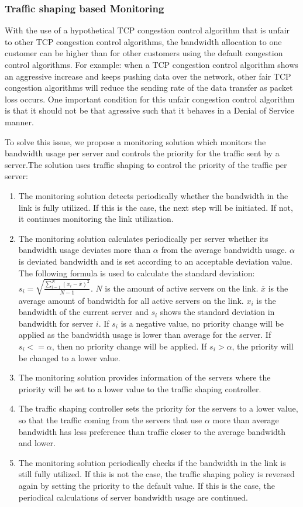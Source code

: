 \documentclass{article}
\begin{document}
\subsubsection{Traffic shaping based Monitoring}
With the use of a hypothetical TCP congestion control algorithm that is unfair to other TCP congestion control algorithms, the bandwidth allocation to one customer can be higher than for other customers using the default congestion control algorithms. For example: when a TCP congestion control algorithm shows an aggressive increase and keeps pushing data over the network, other fair TCP congestion algorithms will reduce the sending rate of the data transfer as packet loss occurs. One important condition for this unfair congestion control algorithm is that it should not be that agressive such that it behaves in a Denial of Service manner.

To solve this issue, we propose a monitoring solution which monitors the bandwidth usage per server and controls the priority for the traffic sent by a server.The solution uses traffic shaping to control the priority of the traffic per server:
\begin{enumerate}
	\item The monitoring solution detects periodically whether the bandwidth in the link is fully utilized. If this is the case, the next step will be initiated. If not, it continues monitoring the link utilization.
	\item The monitoring solution calculates periodically per server whether its bandwidth usage deviates more than $\alpha$ from the average bandwidth usage. $\alpha$ is deviated bandwidth and is set according to an acceptable deviation value. The following formula is used to calculate the standard deviation: $s_{i} = \sqrt{\frac{\sum_{i=1}^N (x_i - \overline{x})^2}{N-1} }$. $N$ is the amount of active servers on the link. $\overline{x}$ is the average amount of bandwidth for all active servers on the link. $x_i$ is the bandwidth of the current server and $s_{i}$ shows the standard deviation in bandwidth for server $i$. If $s_{i}$ is a negative value, no priority change will be applied as the bandwidth usage is lower than average for the server. If $s_{i} <= \alpha$, then no priority change will be applied. If $s_{i} > \alpha$, the priority will be changed to a lower value.
	\item The monitoring solution provides information of the servers where the priority will be set to a lower value to the traffic shaping controller.
	\item The traffic shaping controller sets the priority for the servers to a lower value, so that the traffic coming from the servers that use $\alpha$ more than average bandwidth has less preference than traffic closer to the average bandwidth and lower.
	\item The monitoring solution periodically checks if the bandwidth in the link is still fully utilized. If this is not the case, the traffic shaping policy is reversed again by setting the priority to the default value. If this is the case, the periodical calculations of server bandwidth usage are continued.
\end{enumerate}
\end{document}
